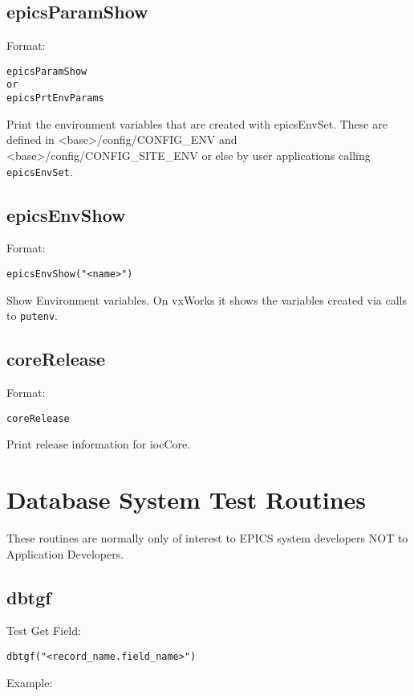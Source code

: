 \subsection{epicsParamShow}

Format:

\begin{verbatim}epicsParamShow
or
epicsPrtEnvParams
\end{verbatim}Print the environment variables that are created with epicsEnvSet. These are defined in \textless{}base\textgreater{}/config/CONFIG\_ENV 
and \textless{}base\textgreater{}/config/CONFIG\_SITE\_ENV or else by user applications calling \verb|epicsEnvSet|.

\subsection{epicsEnvShow}

Format:

\begin{verbatim}epicsEnvShow("<name>")
\end{verbatim}Show Environment variables. On vxWorks it shows the variables created via calls to \verb|putenv|.

\subsection{coreRelease}

Format:

\begin{verbatim}coreRelease
\end{verbatim}Print release information for iocCore.

\section{Database System Test Routines}

These routines are normally only of interest to EPICS system developers NOT to Application Developers.

\subsection{dbtgf}

Test Get Field:

\begin{verbatim}dbtgf("<record_name.field_name>")
\end{verbatim}Example:

